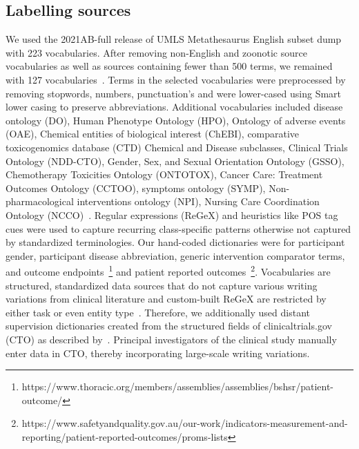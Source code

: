 \documentclass[10.7pt,]{article}
\begin{document}
\subsection{Labelling sources}\label{lss}
%
We used the 2021AB-full release of UMLS Metathesaurus English subset dump with 223 vocabularies. %
After removing non-English and zoonotic source vocabularies as well as sources containing fewer than 500 terms, we remained with 127 vocabularies~\cite{humphreys1998unified}.
Terms in the selected vocabularies were preprocessed by removing stopwords, numbers, punctuation's and were lower-cased using Smart lower casing to preserve abbreviations.
Additional vocabularies included disease ontology (DO), Human Phenotype Ontology (HPO), Ontology of adverse events (OAE), Chemical entities of biological interest (ChEBI),  comparative toxicogenomics database (CTD) Chemical and Disease subclasses, Clinical Trials Ontology (NDD-CTO), Gender, Sex, and Sexual Orientation Ontology (GSSO), Chemotherapy Toxicities Ontology (ONTOTOX), Cancer Care: Treatment Outcomes Ontology (CCTOO), symptoms ontology (SYMP), Non-pharmacological interventions ontology (NPI), Nursing Care Coordination Ontology (NCCO)~\cite{schriml2012disease,robinson2008human,he2014oae,de2010chemical,lin2020cto,kronk2020development,geifman2011towards,rogier2021using,lin2018cancer,mohammed2012building,ninot2018definition}.
Regular expressions (ReGeX) and heuristics like POS tag cues were used to capture recurring class-specific patterns otherwise not captured by standardized terminologies.
Our hand-coded dictionaries were for participant gender, participant disease abbreviation, generic intervention comparator terms, and outcome endpoints~\footnote{https://www.thoracic.org/members/assemblies/assemblies/bshsr/patient-outcome/} and patient reported outcomes~\footnote{https://www.safetyandquality.gov.au/our-work/indicators-measurement-and-reporting/patient-reported-outcomes/proms-lists}.
Vocabularies are structured, standardized data sources that do not capture various writing variations from clinical literature and custom-built ReGeX are restricted by either task or even entity type~\cite{ratner2017snorkel,safranchik2020weakly}.
Therefore, we additionally used distant supervision dictionaries created from the structured fields of clinicaltrials.gov (CTO) as described by~\cite{dhrangadhariya2022distant}.
Principal investigators of the clinical study manually enter data in CTO, thereby incorporating large-scale writing variations.  
%
%
%
\end{document}
